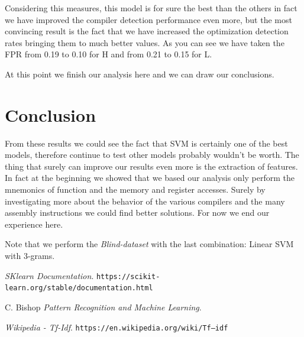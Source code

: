 \documentclass[12pt]{article}
\begin{document}
Considering this measures, this model is for sure the best than the others in fact we have improved the compiler detection performance even more, but the most convincing result is the fact that we have increased the optimization detection rates bringing them to much better values. As you can see we have taken the FPR from 0.19 to 0.10 for H and from 0.21 to 0.15 for L.

At this point we finish our analysis here and we can draw our conclusions.

\section{Conclusion}
From these results we could see the fact that SVM is certainly one of the best models, therefore continue to test other models probably wouldn't be worth. The thing that surely can improve our results even more is the extraction of features. In fact at the beginning we showed that we based our analysis only perform the mnemonics of function and the memory and register accesses. Surely by investigating more about the behavior of the various compilers and the many assembly instructions we could find better solutions. For now we end our experience here.

Note that we perform the {\em Blind-dataset} with the last combination: Linear SVM with 3-grams.

\vfill

\begin{thebibliography}{99}

{\em SKlearn Documentation}. 
  \verb|https://scikit-learn.org/stable/documentation.html|

C. Bishop
  {\em Pattern Recognition and Machine Learning}.

{\em Wikipedia - Tf-Idf}.
  \verb|https://en.wikipedia.org/wiki/Tf–idf|

\end{thebibliography}
\end{document}
